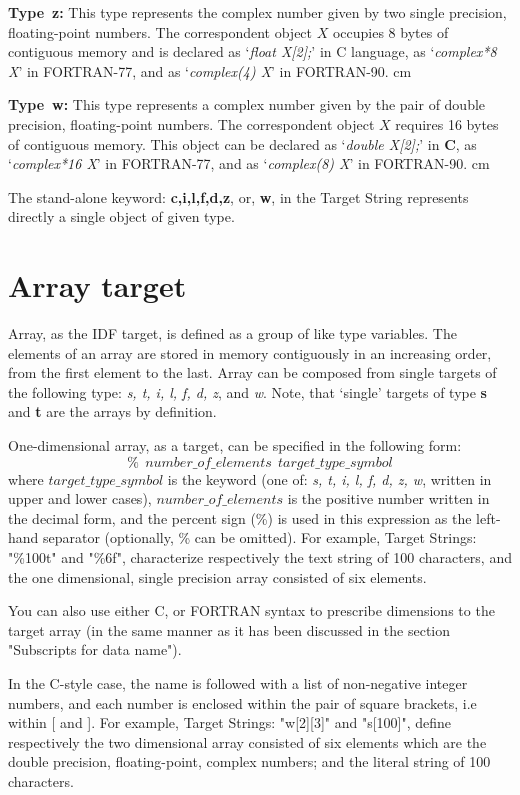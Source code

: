 {\bf Type\ z:}\hfil\break
This type represents the complex number
given by two single precision, floating-point numbers.
The correspondent object $X$ occupies 8 bytes of contiguous memory
and is declared as `{\it float X[2];}' in C language,
as `{\it complex*8 X}' in FORTRAN-77, 
and as `{\it complex(4) X}' in FORTRAN-90.
 cm

{\bf Type\ w:}\hfil\break
This type represents a complex number
given by the pair of double precision, floating-point numbers.
The correspondent object $X$ requires 16 bytes of
contiguous memory.
This object can be declared as `{\it double X[2];}' in {\bf C},
as `{\it complex*16 X}' in FORTRAN-77, 
and as `{\it complex(8) X}' in FORTRAN-90.
 cm

The stand-alone keyword: {\bf c,i,l,f,d,z}, or, {\bf w},
in the Target String represents directly a single object of given type.

\section*{Array target}

Array, as the IDF target, is defined as a group of like type variables.
The elements of an array are stored in memory contiguously
in an increasing order, from the first element to the last.
Array can be composed from single targets of the following type:
{\it s, t, i, l, f, d, z}, and {\it w}. 
Note, that `single' targets of type {\bf s} and {\bf t} 
are the arrays by definition.

One-dimensional array, as a target, can be specified
in the following form:
$$ \%\ \ number\_of\_elements\ \ target\_type\_symbol$$
where $target\_type\_symbol$ is the keyword 
(one of: {\it s, t, i, l, f, d, z, w}, written in upper and lower cases),  
$number\_of\_elements$ is the positive number written in the decimal form,
and the percent sign (\%) is used in this expression as the left-hand separator
(optionally, \% can be omitted). 
For example, Target Strings:  "\%100t" and "\%6f", characterize respectively
the text string of 100 characters, and the one dimensional,
single precision array consisted of six elements.

You can also use either C, or FORTRAN syntax to prescribe
dimensions to the target array (in the same manner as it has been discussed in 
the section "Subscripts for data name").

In the C-style case, the name is followed with
a list of  non-negative integer numbers, 
and each number is enclosed within the pair of square brackets,
i.e within [ and ]. 
For example,  Target Strings:
"w[2][3]" and "s[100]", define respectively
the two dimensional array consisted of six elements which
are the double precision, floating-point, complex numbers;
and the literal string of 100 characters. 

